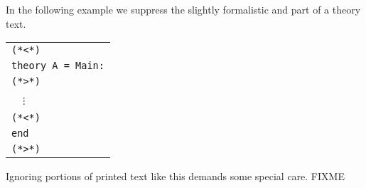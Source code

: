 \begin{isabellebody}
\begin{isamarkuptext}
  In the following example we suppress the slightly formalistic
   and  part of a theory text.

  \medskip

  \begin{tabular}{l}
  \verb,(,\verb,*,\verb,<,\verb,*,\verb,), \\
  \texttt{theory A = Main:} \\
  \verb,(,\verb,*,\verb,>,\verb,*,\verb,), \\
  ~~$\vdots$ \\
  \verb,(,\verb,*,\verb,<,\verb,*,\verb,), \\
  \texttt{end} \\
  \verb,(,\verb,*,\verb,>,\verb,*,\verb,), \\
  \end{tabular}

  \medskip

  Ignoring portions of printed text like this demands some special
  care. FIXME%
\end{isamarkuptext}%
\isamarkuptrue%
\isamarkupfalse%
\end{isabellebody}%
